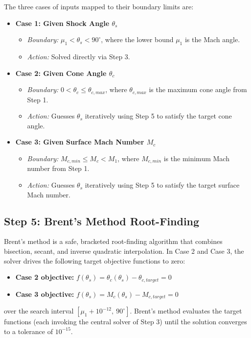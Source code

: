 The three cases of inputs mapped to their boundary limits are:
\begin{itemize}
    \item \textbf{Case 1: Given Shock Angle $\theta_s$}
    \begin{itemize}[nosep]
        \item \textit{Boundary:} $\mu_1 < \theta_s < 90^\circ$, where the lower bound $\mu_1$ is the Mach angle.
        \item \textit{Action:} Solved directly via Step 3.
    \end{itemize}
    \item \textbf{Case 2: Given Cone Angle $\theta_c$}
    \begin{itemize}[nosep]
        \item \textit{Boundary:} $0 < \theta_c \le \theta_{c,max}$, where $\theta_{c,max}$ is the maximum cone angle from Step 1.
        \item \textit{Action:} Guesses $\theta_s$ iteratively using Step 5 to satisfy the target cone angle.
    \end{itemize}
    \item \textbf{Case 3: Given Surface Mach Number $M_c$}
    \begin{itemize}[nosep]
        \item \textit{Boundary:} $M_{c,min} \le M_c < M_1$, where $M_{c,min}$ is the minimum Mach number from Step 1.
        \item \textit{Action:} Guesses $\theta_s$ iteratively using Step 5 to satisfy the target surface Mach number.
    \end{itemize}
\end{itemize}

\subsection*{Step 5: Brent's Method Root-Finding}

Brent's method is a safe, bracketed root-finding algorithm that combines bisection, secant, and inverse quadratic interpolation. In Case 2 and Case 3, the solver drives the following target objective functions to zero:
\begin{itemize}
    \item \textbf{Case 2 objective:} $f(\theta_s) = \theta_c(\theta_s) - \theta_{c,target} = 0$
    \item \textbf{Case 3 objective:} $f(\theta_s) = M_c(\theta_s) - M_{c,target} = 0$
\end{itemize}
over the search interval $[\mu_1 + 10^{-12},\ 90^\circ]$. Brent's method evaluates the target functions (each invoking the central solver of Step 3) until the solution converges to a tolerance of $10^{-15}$.



